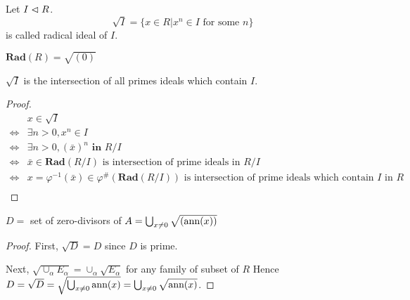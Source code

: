 \documentclass{amsart}
\begin{document}
\begin{secdefn}
	Let $I \vartriangleleft R$.
	\[
	\sqrt{I} = \big\{x \in R| x^n \in I \text{ for some } n \big\}
	\]
	is called radical ideal of $I$.
\end{secdefn}
\begin{rem}
	$\textbf{Rad}(R)= \sqrt{(0)}$
\end{rem}

\begin{secprop}
	$\sqrt{I}$ is the intersection of all primes ideals which contain $I$.
\end{secprop}
\begin{proof}
	\[
	\begin{aligned}
		 & x \in \sqrt{I}&\\
		 \Leftrightarrow& \exists n >0 , x^n \in I&\\
		 \Leftrightarrow& \exists n >0, (\bar{x})^{n} \textbf{ in } R/I&\\
		 \Leftrightarrow& \bar{x} \in \textbf{Rad}(R/I) \text{ is intersection of prime ideals in } R/I&\\
		 \Leftrightarrow& x= \varphi^{-1}(\bar{x}) \in \varphi^{\#}(\textbf{Rad}(R/I))\text{ is intersection of prime ideals which contain }I \text{ in } R&\\
	\end{aligned}
	\]
\end{proof}

\begin{secprop}
	$D=$ set of zero-divisors of $A= \bigcup_{x \neq 0} \sqrt{(\text{ann}(x))}$  
\end{secprop}
\begin{proof}
	First, $\sqrt{D} = D$ since $D$ is prime.
	
	Next, $\sqrt{\cup_{\alpha} E_\alpha} = \cup_{\alpha} \sqrt{E_\alpha}$ for any family of subset of $R$
	Hence $D= \sqrt{D} = \sqrt{\bigcup_{x \neq 0} \text{ann}(x)} = \bigcup_{x \neq 0} \sqrt{\text{ann}(x)}$.
\end{proof}

\end{document}
